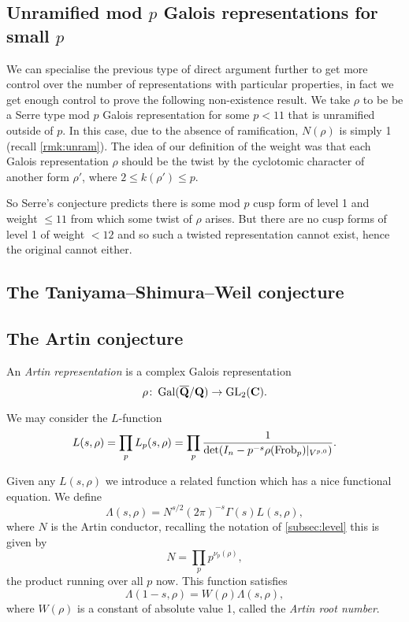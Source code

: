 \documentclass[a4paper,12pt]{article}
\begin{document}
\subsection{Unramified mod $p$ Galois representations for small $p$}
We can specialise the previous type of direct argument further to get more control over the number of representations with particular properties, in fact we get enough control to prove the following non-existence result.
We take $\rho$ to be be a Serre type mod $p$ Galois representation for some $p < 11$ that is unramified outside of $p$.
In this case, due to the absence of ramification, $N(\rho)$ is simply 1 (recall \cref{rmk:unram}).
The idea of our definition of the weight was that each Galois representation $\rho$ should be the twist by the cyclotomic character of another form $\rho'$, where $ 2\le k(\rho')\le p$.

So Serre's conjecture predicts there is some mod $p$ cusp form of level 1 and weight $\le 11$ from which some twist of $\rho$ arises.
But there are no cusp forms of level 1 of weight $< 12$ and so such a twisted representation cannot exist, hence the original cannot either.



\subsection{The Taniyama--Shimura--Weil conjecture}\label{sec:tan}


\subsection{The Artin conjecture}\label{sec:artin}
\begin{defn}
An \emph{Artin representation} is a complex Galois representation
\[
\rho\colon \operatorname{Gal}(\overline{\mathbf{Q}}/\mathbf{Q}) \to \operatorname{GL}_2(\mathbf{C}).
\]
\end{defn}

We may consider the $L$-function
\[
L(s, \rho) = \prod_{p} L_p(s,\rho) = \prod_{p} \frac{1}{\det(I_n - p^{-s}\rho(\operatorname{Frob}_p) |_{V^{p,0}})}.
\]

Given any $L(s,\rho)$ we introduce a related function which has a nice functional equation.
We define
\[
\Lambda(s, \rho) = N^{s/2} (2\pi)^{-s} \Gamma(s)L(s,\rho),
\]
where $N$ is the Artin conductor, recalling the notation of \cref{subsec:level} this is given by
\[
N = \prod_{p}p^{\nu_p(\rho)},
\]
the product running over all $p$ now.
This function satisfies
\[
\Lambda(1-s, \rho) = W(\rho)\Lambda(s,\rho),
\]
where $W(\rho)$ is a constant of absolute value 1, called the \emph{Artin root number}.
\end{document}
